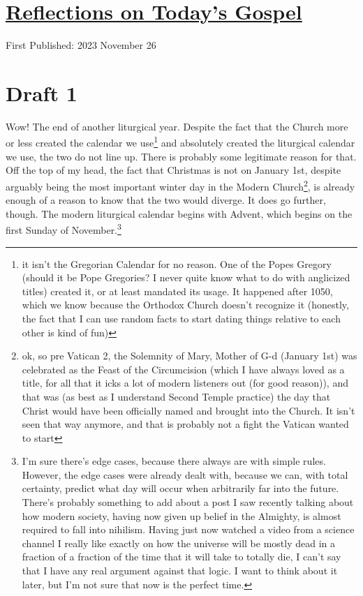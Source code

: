 \documentclass[12pt]{article}[titlepage]
\newcommand{\1}{\={a}}
\newcommand{\2}{\={e}}
\newcommand{\3}{\={\i}}
\newcommand{\4}{\=o}
\newcommand{\5}{\=u}
\newcommand{\6}{\={A}}
\renewcommand{\,}{\textsuperscript{,}}
\begin{document}
\doublespacing
\section{\href{reflections-on-readings-christ-king-a-23.html}{Reflections on Today's Gospel}}
First Published: 2023 November 26

\section{Draft 1}
Wow! The end of another liturgical year.
Despite the fact that the Church more or less created the calendar we use\footnote{it isn't the Gregorian Calendar for no reason. One of the Popes Gregory (should it be Pope Gregories? I never quite know what to do with anglicized titles) created it, or at least mandated its usage. It happened after 1050, which we know because the Orthodox Church doesn't recognize it (honestly, the fact that I can use random facts to start dating things relative to each other is kind of fun)} and absolutely created the liturgical calendar we use, the two do not line up.
There is probably some legitimate reason for that.
Off the top of my head, the fact that Christmas is not on January 1st, despite arguably being the most important winter day in the Modern Church\footnote{ok, so pre Vatican 2, the Solemnity of Mary, Mother of G-d (January 1st) was celebrated as the Feast of the Circumcision (which I have always loved as a title, for all that it icks a lot of modern listeners out (for good reason)), and that was (as best as I understand Second Temple practice) the day that Christ would have been officially named and brought into the Church. It isn't seen that way anymore, and that is probably not a fight the Vatican wanted to start}, is already enough of a reason to know that the two would diverge.
It does go further, though.
The modern liturgical calendar begins with Advent, which begins on the first Sunday of November.\footnote{I'm sure there's edge cases, because there always are with simple rules.
However, the edge cases were already dealt with, because we can, with total certainty, predict what day will occur when arbitrarily far into the future. There's probably something to add about a post I saw recently talking about how modern society, having now given up belief in the Almighty, is almost required to fall into nihilism. Having just now watched a video from a science channel I really like exactly on how the universe will be mostly dead in a fraction of a fraction of the time that it will take to totally die, I can't say that I have any real argument against that logic. I want to think about it later, but I'm not sure that now is the perfect time.}
\end{document}

